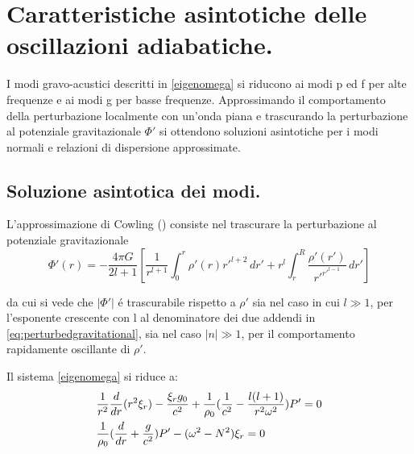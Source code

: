 \documentclass[../main.tex]{subfiles}
\begin{document}
{\let\clearpage\relax\let\cleardoublepage\relax           %
\chapter{Caratteristiche asintotiche delle oscillazioni adiabatiche.}\label{chap:asyntoticbehavour}
}

I modi gravo-acustici descritti in \eqref{eigenomega} si riducono ai modi p ed f per alte frequenze e ai modi g per basse frequenze. Approssimando il comportamento della perturbazione localmente con un'onda piana e trascurando la perturbazione al potenziale gravitazionale $\Phi'$ si ottendono soluzioni asintotiche per i modi normali e relazioni di dispersione approssimate.

\section{Soluzione asintotica dei modi.}

L'approssimazione di Cowling (\cite{cow41oscillations}) consiste nel trascurare la perturbazione al potenziale gravitazionale
\begin{equation}
\Phi'(r)=-\frac{4\pi G}{2l+1}\left[\frac{1}{r^{l+1}}\int_0^r\rho'(r)r'^{l+2}\,dr'+r^l\int_r^R\frac{\rho'(r')}{r'^{r'^{l-1}}}\,dr'\right]\label{eq:perturbedgravitational}
\end{equation}

da cui si vede che $|\Phi'|$ \'e trascurabile rispetto a $\rho'$ sia nel caso in cui $l\gg1$, per l'esponente crescente con l al denominatore dei due addendi in \eqref{eq:perturbedgravitational}, sia nel caso $|n|\gg1$, per il comportamento rapidamente oscillante di $\rho'$.

Il sistema \eqref{eigenomega} si riduce a:
\begin{subequations}\label{cowosc:main}
\begin{align}
&\frac{1}{r^2}\frac{d}{d r}(r^2\xi_r)-\frac{\xi_rg_0}{c^2}+\frac{1}{\rho_0}(\frac{1}{c^2}-\frac{l(l+1)}{r^2\omega^2})P'=0\label{cowosc:a}\\
&\frac{1}{\rho_0}(\frac{d}{d r}+\frac{g}{c^2})P'-(\omega^2-N^2)\xi_r=0\label{cowosc:b}
\end{align}
\end{subequations}
\end{document}
